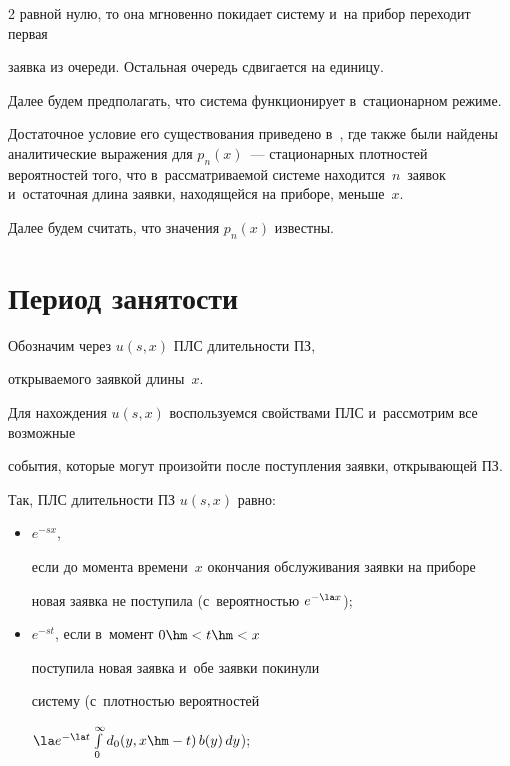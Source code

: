 \begin{multicols}{2}
равной нулю, то она мгновенно покидает систему и~на прибор переходит первая


заявка из очереди. Остальная очередь сдвигается на единицу.








Далее будем предполагать, что система функционирует в~стационарном режиме.


Достаточное условие его существования приведено в~\cite{lataavrv}, где также были найдены аналитические выражения для $p_n(x)$~--- стационарных плотностей вероятностей того, что в~рассматриваемой системе находится~$n$~заявок и~остаточная длина заявки, находящейся на приборе, меньше~$x$.


Далее будем считать, что значения $p_n(x)$ известны.





\section{Период занятости}





Обозначим через $u(s,x)$ ПЛС длительности ПЗ,


открываемого заявкой длины~$x$.


Для нахождения $u(s,x)$ воспользуемся свойствами ПЛС и~рас\-смот\-рим все возможные


события, которые могут произойти после поступления заявки, открывающей ПЗ.


Так, ПЛС длительности ПЗ  $u(s,x)$ равно:


\begin{itemize}


\item  $e^{-s x}$,


если до момента времени~$x$ окончания обслуживания заявки на приборе


новая заявка не поступила (с~вероятностью $e^{-\la x}$);





\item $e^{-s t}$, если в~момент $0\hm<t\hm<x$


поступила новая заявка и~обе заявки покинули


систему (с~плот\-ностью вероятностей


$\la e^{-\la t} \int\limits_0^\infty d_0(y,x\hm-t)\,b(y)\,dy$);






\end{itemize}
\end{multicols}
